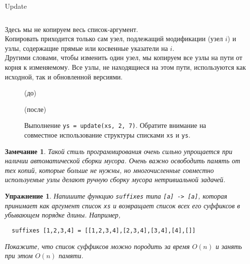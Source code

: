 \documentclass[aspectratio=169
  , xcolor={svgnames}
  , hyperref={ colorlinks,citecolor=DeepPink4
             , linkcolor=DarkRed,urlcolor=DarkBlue}
  , russian
  ]{beamer}
\newtheorem{remark}{\textbf{Замечание}}[section]
\theoremstyle{exerciseStyle1}
\newtheorem{exercise}{\textbf{Упражнение}}[section]
\begin{document}
\begin{frame}[fragile]{Update}
\inputminted[firstline=61,lastline=64] {haskell}{code/Stacks.hs}
Здесь мы не копируем весь список-аргумент.\\

Копировать приходится
только сам узел, подлежащий модификации (узел $i$) и узлы,
содержащие прямые или косвенные указатели на $i$. \\

Другими словами,
чтобы изменить один узел, мы копируем все узлы на пути от корня
к изменяемому. Все узлы, не находящиеся на этом пути, используются как
исходной, так и обновленной версиями. 
\end{frame}

\begin{frame}[fragile]{}
\begin{figure}[h]
	\centering
	\par
	(до)\par
	\vspace{0.5cm}
	\par
	(после)\par
	\vspace{0.5cm}	
	\caption{Выполнение \texttt{ys = update(xs, 2, 7)}. Обратите
		внимание на совместное использование структуры списками \texttt{xs} и \texttt{ys}.}
	\label{fig:2.6}
\end{figure}
\end{frame}

\begin{frame}[fragile]
\begin{remark}
	Такой стиль программирования очень сильно упрощается при наличии
	автоматической сборки мусора. Очень важно освободить память от тех
	копий, которые больше не нужны, но многочисленные совместно используемые
	узлы делают ручную сборку мусора нетривиальной задачей.
\end{remark}
\begin{exercise}\label{ex:2.1}
  Напишите функцию \texttt{suffixes} типа \texttt{[a] -> [a]}, которая принимает как
  аргумент список \texttt{xs} и возвращает список всех его
  суффиксов в убывающем порядке длины. Например,
  \begin{verbatim}
  suffixes [1,2,3,4] = [[1,2,3,4],[2,3,4],[3,4],[4],[]]
  \end{verbatim}
  Покажите, что список суффиксов можно породить за время $O(n)$ и
  занять при этом $O(n)$ памяти.
\end{exercise}

\end{frame}
\end{document}
